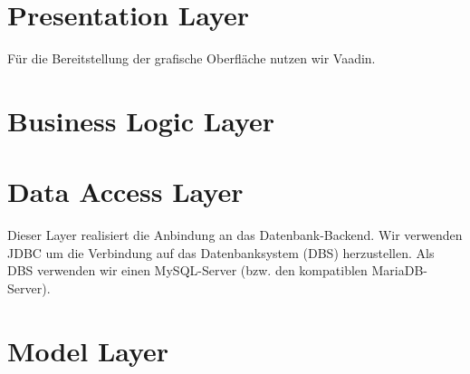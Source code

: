 \documentclass[a4paper]{scrreprt}
\begin{document}
\section{Presentation Layer}
Für die Bereitstellung der grafische Oberfläche nutzen wir Vaadin. 



\section{Business Logic Layer}



\section{Data Access Layer}
Dieser Layer realisiert die Anbindung an das Datenbank-Backend. Wir verwenden JDBC um die Verbindung auf das Datenbanksystem (DBS) herzustellen. Als DBS verwenden wir einen MySQL-Server (bzw. den kompatiblen MariaDB-Server).




\section{Model Layer}
\end{document}
